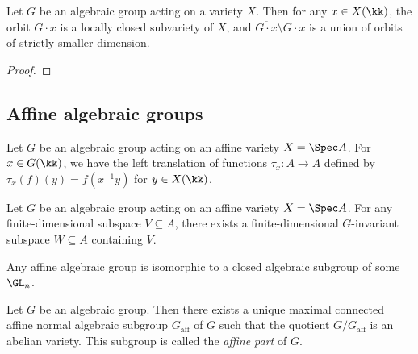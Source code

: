     \begin{proposition}\label{prop:orbit_is_locally_closed}
        Let \(G\) be an algebraic group acting on a variety \(X\).
        Then for any \(x \in X(\kk)\), the orbit \(G \cdot x\) is a locally closed subvariety of \(X\), and \(\overline{G \cdot x} \setminus G \cdot x \) is a union of orbits of strictly smaller dimension.
    \end{proposition}
    \begin{proof}
    \end{proof}

\subsection{Affine algebraic groups}

    Let \(G\) be an algebraic group acting on an affine variety \(X = \Spec A\).
    For \(x \in G(\kk)\), we have the left translation of functions \(\tau_x: A \to A\) defined by \(\tau_x(f)(y) = f(x^{-1}y)\) for \(y \in X(\kk)\).

    \begin{lemma}\label{lem:finite_dimensional_invariant_subspace}
        Let \(G\) be an algebraic group acting on an affine variety \(X = \Spec A\).
        For any finite-dimensional subspace \(V \subseteq A\), there exists a finite-dimensional \(G\)-invariant subspace \(W \subseteq A\) containing \(V\).
    \end{lemma}

    \begin{theorem}\label{thm:affine_algebraic_group_is_linear}
        Any affine algebraic group is isomorphic to a closed algebraic subgroup of some \(\GL_n\).
    \end{theorem}

    \begin{theorem}\label{thm:Chavellaye_decomposition}
        Let \(G\) be an algebraic group.
        Then there exists a unique maximal connected affine normal algebraic subgroup \(G_{\text{aff}}\) of \(G\) such that the quotient \(G/G_{\text{aff}}\) is an abelian variety.
        This subgroup is called the \emph{affine part} of \(G\).
    \end{theorem}

